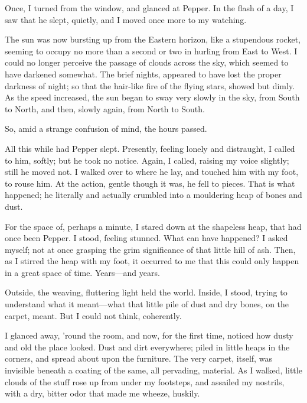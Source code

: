 Once, I turned from the window, and glanced at Pepper. In the flash of a day, I saw that he slept, quietly, and I moved once more to my watching.

The sun was now bursting up from the Eastern horizon, like a stupendous rocket, seeming to occupy no more than a second or two in hurling from East to West. I could no longer perceive the passage of clouds across the sky, which seemed to have darkened somewhat. The brief nights, appeared to have lost the proper darkness of night; so that the hair-like fire of the flying stars, showed but dimly. As the speed increased, the sun began to sway very slowly in the sky, from South to North, and then, slowly again, from North to South.

So, amid a strange confusion of mind, the hours passed.

All this while had Pepper slept. Presently, feeling lonely and distraught, I called to him, softly; but he took no notice. Again, I called, raising my voice slightly; still he moved not. I walked over to where he lay, and touched him with my foot, to rouse him. At the action, gentle though it was, he fell to pieces. That is what happened; he literally and actually crumbled into a mouldering heap of bones and dust.

For the space of, perhaps a minute, I stared down at the shapeless heap, that had once been Pepper. I stood, feeling stunned. What can have happened? I asked myself; not at once grasping the grim significance of that little hill of ash. Then, as I stirred the heap with my foot, it occurred to me that this could only happen in a great space of time. Years---and years.

Outside, the weaving, fluttering light held the world. Inside, I stood, trying to understand what it meant---what that little pile of dust and dry bones, on the carpet, meant. But I could not think, coherently.

I glanced away, ’round the room, and now, for the first time, noticed how dusty and old the place looked. Dust and dirt everywhere; piled in little heaps in the corners, and spread about upon the furniture. The very carpet, itself, was invisible beneath a coating of the same, all pervading, material. As I walked, little clouds of the stuff rose up from under my footsteps, and assailed my nostrils, with a dry, bitter odor that made me wheeze, huskily.

